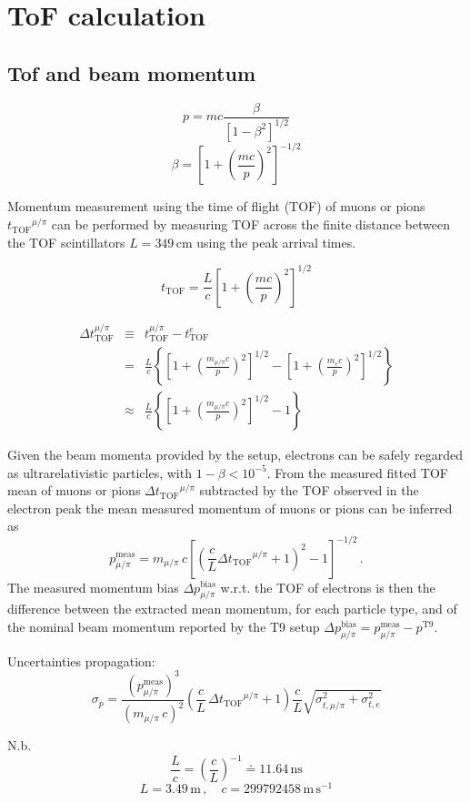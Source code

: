 \documentclass{article}
\newcommand{\ttof}{\ensuremath{t_\mathrm{TOF}}}
\begin{document}
\section{ToF calculation}

\subsection{Tof and beam momentum}


$$ p = mc \frac{\beta}{\left[  1 - \beta^2 \right]^{1/2}}$$
$$ \beta = \left[  1 + \left( \frac{mc}{p} \right)^2 \right]^{-1/2}$$


Momentum measurement using the time of flight (TOF) of muons or pions $\ttof^{\mu/\pi}$ can be performed by measuring TOF across the finite distance between the TOF scintillators $L=349\,\mathrm{cm}$ using the peak arrival times.

$$ t_\mathrm{TOF} = \frac{L}{c} \left[ 1 + \left( \frac{mc}{p}  \right)^2   \right]^{1/2}$$

\begin{eqnarray}
  \Delta t_\mathrm{TOF}^{\mu/\pi} &\equiv&  t^{\mu/\pi}_\mathrm{TOF} - t^e_\mathrm{TOF} \\
    &=& \frac{L}{c}  \left\{  \left[ 1 + \left( \frac{m_{\mu/\pi} c}{p}  \right)^2   \right]^{1/2} -  \left[ 1 + \left( \frac{m_e c}{p}  \right)^2   \right]^{1/2}   \right\} \\
     &\approx& \frac{L}{c}  \left\{  \left[ 1 + \left( \frac{m_{\mu/\pi} c}{p}  \right)^2   \right]^{1/2} - 1  \right\} 
\end{eqnarray}

    Given the beam momenta provided by the setup, electrons can be safely regarded as ultrarelativistic particles, with $1-\beta < 10^{-5}$.
From the measured fitted TOF mean of muons or pions $\Delta\ttof^{\mu/\pi}$ subtracted by the TOF observed in the electron peak the mean measured momentum of muons or pions 
can be inferred as 
$$p_{\mu/\pi}^\mathrm{meas} = m_{\mu/\pi} \, c \left[ \left( \frac{c}{L} \Delta\ttof^{\mu/\pi} + 1 \right)^2  - 1\right]^{-1/2}\,.$$
The measured momentum bias $\Delta p^\mathrm{bias}_{\mu/\pi}$ w.r.t. the TOF of electrons is then the difference between the extracted mean momentum, for each particle type, and of the nominal beam momentum reported by the T9 setup
$\Delta p^\mathrm{bias}_{\mu/\pi} =  p_{\mu/\pi}^\mathrm{meas} -  p^\mathrm{T9}$. 

Uncertainties propagation:
$$ \sigma_p = \frac{ \left( p_{\mu/\pi}^\mathrm{meas} \right)^3}{ \left(  m_{\mu/\pi} \, c \right)^2} \left( \frac{c}{L} \,\Delta\ttof^{\mu/\pi} + 1  \right)  \frac{c}{L} \sqrt{\sigma^2_{t,\mu/\pi} + \sigma^2_{t,e}}$$

N.b.
$$ \frac{L}{c} = \left( \frac{c}{L} \right)^{-1} \doteq 11.64\,\mathrm{ns}$$
$$ L = 3.49\, \mathrm{m}\,, \quad c = 299792458\, \mathrm{m}\,\mathrm{s}^{-1}$$
\end{document}
